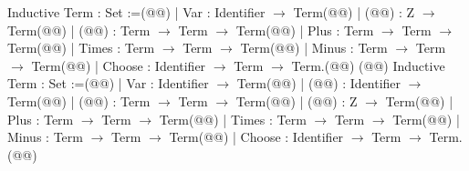 Inductive Term : Set :=(@\vspace{-0.04cm}@)
| Var : Identifier $\rightarrow$ Term(@\vspace{-0.04cm}@)
| (@@) : Z $\rightarrow$ Term(@\vspace{-0.04cm}@)
| (@@) : Term $\rightarrow$ Term $\rightarrow$ Term(@\vspace{-0.04cm}@)
| Plus : Term $\rightarrow$ Term $\rightarrow$ Term(@\vspace{-0.04cm}@)
| Times : Term $\rightarrow$ Term $\rightarrow$ Term(@\vspace{-0.04cm}@)
| Minus : Term $\rightarrow$ Term $\rightarrow$ Term(@\vspace{-0.04cm}@)
| Choose : Identifier $\rightarrow$ Term $\rightarrow$ Term.(@\vspace{-0.04cm}@)
(@\vspace{-0.18cm}@)
Inductive Term : Set :=(@\vspace{-0.04cm}@)
| Var : Identifier $\rightarrow$ Term(@\vspace{-0.04cm}@)
| (@@) : Identifier $\rightarrow$ Term(@\vspace{-0.04cm}@)
| (@@) : Term $\rightarrow$ Term $\rightarrow$ Term(@\vspace{-0.04cm}@)
| (@@) : Z $\rightarrow$ Term(@\vspace{-0.04cm}@)
| Plus : Term $\rightarrow$ Term $\rightarrow$ Term(@\vspace{-0.04cm}@)
| Times : Term $\rightarrow$ Term $\rightarrow$ Term(@\vspace{-0.04cm}@)
| Minus : Term $\rightarrow$ Term $\rightarrow$ Term(@\vspace{-0.04cm}@)
| Choose : Identifier $\rightarrow$ Term $\rightarrow$ Term.(@\vspace{-0.04cm}@)
